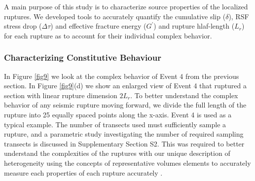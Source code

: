 \documentclass[draft]{agujournal2019}
\begin{document}
A main purpose of this study is to characterize source properties of the localized ruptures. We developed tools to accurately quantify the cumulative slip ($\delta$), RSF stress drop ($\Delta \tau$) and effective fracture energy ($G^{'}$) and rupture hlaf-length ($L_{r}$) for each rupture as to account for their individual complex behavior.

\subsubsection{Characterizing Constitutive Behaviour}
\label{Constitutive}

In Figure \ref{fig9} we look at the complex behavior of Event 4 from the previous section.  In Figure \ref{fig9}(d) we show an enlarged view of Event 4 that ruptured a section with linear rupture dimension $2L_{r}$.  To better understand the complex behavior of any seismic rupture moving forward, we divide the full length of the rupture into 25 equally spaced points along the x-axis.  Event 4 is used as a typical example. The number of transects used must sufficiently sample a rupture, and a parametric study investigating the number of required sampling transects is discussed in Supplementary Section S2. This was required to better understand the complexities of the ruptures with our unique description of heterogeneity using the concepts of representative volumes elements to accurately measure each properties of each rupture accurately \cite{Hill1963}.   
\end{document}
